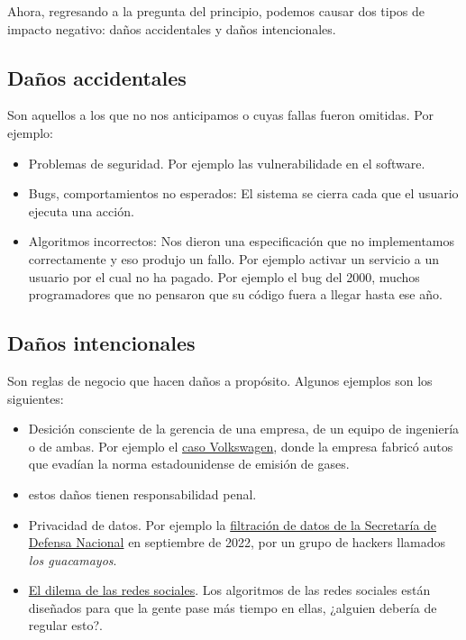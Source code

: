 \documentclass[twoside]{article}
\begin{document}
\begin{multicols}{2}
Ahora, regresando a la pregunta del principio, podemos causar dos tipos de
impacto negativo: daños accidentales y daños intencionales.

\subsection{Daños accidentales}

Son aquellos a los que no nos anticipamos o cuyas fallas fueron omitidas. Por
ejemplo:

\begin{itemize}
\item Problemas de seguridad. Por ejemplo las vulnerabilidade en el software.
\item Bugs, comportamientos no esperados: El sistema se cierra cada que el
usuario ejecuta una acción.
\item Algoritmos incorrectos: Nos dieron una especificación que no implementamos
correctamente y eso produjo un fallo. Por ejemplo activar un servicio a un
usuario por el cual no ha pagado. Por ejemplo el bug del 2000, muchos
programadores que no pensaron que su código fuera a llegar hasta ese año.
\end{itemize}

\subsection{Daños intencionales}

Son reglas de negocio que hacen daños a propósito. Algunos ejemplos son los
siguientes:

\begin{itemize}
\item Desición consciente de la gerencia de una empresa, de un equipo de
ingeniería o de ambas. Por ejemplo el
\href{https://repositorio.comillas.edu/rest/bitstreams/295635/retrieve}{caso
Volkswagen}, donde la empresa fabricó autos que evadían la norma estadounidense
de emisión de gases.
\item estos daños tienen responsabilidad penal.
\item Privacidad de datos. Por ejemplo la
\href{https://elpais.com/mexico/2022-10-01/una-masiva-filtracion-expone-el-poder-del-ejercito-mexicano-en-la-vida-publica.html}{filtración
de datos de la Secretaría de Defensa Nacional} en septiembre de 2022, por un
grupo de hackers llamados \textit{los guacamayos}.
\item
\href{https://www.netflix.com/es/title/81254224#:~:text=Este%20documental%20dramatizado%20analiza%20la,las%20herramientas%20creadas%20por%20ellos.&text=Ve%20todo%20lo%20que%20quieras.&text=De%20Jeff%20Orlowski%2C%20director%20del,'%2C%20ganador%20del%20premio%20Emmy.}
{El dilema de las redes sociales}. Los algoritmos de las redes sociales
están diseñados para que la gente pase más tiempo en ellas, ¿alguien debería de
regular esto?.
\end{itemize}


\end{multicols}
\end{document}

